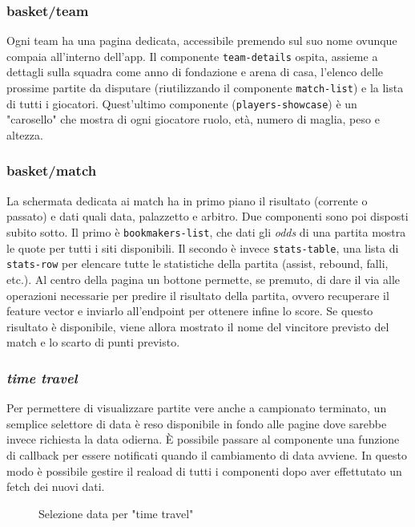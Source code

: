 \subsubsection{basket/team}
Ogni team ha una pagina dedicata, accessibile premendo sul suo nome ovunque compaia all'interno dell'app. Il componente \texttt{team-details} ospita, assieme a dettagli sulla squadra come anno di fondazione e arena di casa, l'elenco delle prossime partite da disputare (riutilizzando il componente \texttt{match-list}) e la lista di tutti i giocatori. Quest'ultimo componente (\texttt{players-showcase}) è un "carosello" che mostra di ogni giocatore ruolo, età, numero di maglia, peso e altezza.

\subsubsection{basket/match}
La schermata dedicata ai match ha in primo piano il risultato (corrente o passato) e dati quali data, palazzetto e arbitro. Due componenti sono poi disposti subito sotto. Il primo è \texttt{bookmakers-list}, che dati gli \textit{odds} di una partita mostra le quote per tutti i siti disponibili. Il secondo è invece \texttt{stats-table}, una lista di \texttt{stats-row} per elencare tutte le statistiche della partita (assist, rebound, falli, etc.).
Al centro della pagina un bottone permette, se premuto, di dare il via alle operazioni necessarie per predire il risultato della partita, ovvero recuperare il feature vector e inviarlo all'endpoint per ottenere infine lo score. Se questo risultato è disponibile, viene allora mostrato il nome del vincitore previsto del match e lo scarto di punti previsto. 

\subsubsection{\textit{time travel}}
Per permettere di visualizzare partite vere anche a campionato terminato, un semplice selettore di data è reso disponibile in fondo alle pagine dove sarebbe invece richiesta la data odierna. È possibile passare al componente una funzione di callback per essere notificati quando il cambiamento di data avviene. In questo modo è possibile gestire il reaload di tutti i componenti dopo aver effettutato un fetch dei nuovi dati.
\begin{figure}[H]
    \centering
    \caption{Selezione data per "time travel"}
    \label{fig:enter-label}
\end{figure}


